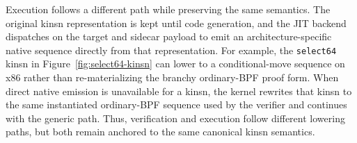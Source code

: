 Execution follows a different path while preserving the same semantics. The original kinsn representation is kept until code generation, and the JIT backend dispatches on the target and sidecar payload to emit an architecture-specific native sequence directly from that representation. For example, the \texttt{select64} kinsn in Figure~\ref{fig:select64-kinsn} can lower to a conditional-move sequence on x86 rather than re-materializing the branchy ordinary-BPF proof form. When direct native emission is unavailable for a kinsn, the kernel rewrites that kinsn to the same instantiated ordinary-BPF sequence used by the verifier and continues with the generic path. Thus, verification and execution follow different lowering paths, but both remain anchored to the same canonical kinsn semantics.

